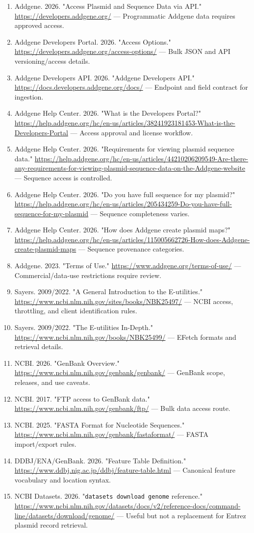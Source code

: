 \documentclass[11pt]{report}
\begin{document}
\begin{enumerate}
\item Addgene. 2026. "Access Plasmid and Sequence Data via API." \url{https://developers.addgene.org/} — Programmatic Addgene data requires approved access.
\item Addgene Developers Portal. 2026. "Access Options." \url{https://developers.addgene.org/access-options/} — Bulk JSON and API versioning/access details.
\item Addgene Developers API. 2026. "Addgene Developers API." \url{https://docs.developers.addgene.org/docs/} — Endpoint and field contract for ingestion.
\item Addgene Help Center. 2026. "What is the Developers Portal?" \url{https://help.addgene.org/hc/en-us/articles/38241923181453-What-is-the-Developers-Portal} — Access approval and license workflow.
\item Addgene Help Center. 2026. "Requirements for viewing plasmid sequence data." \url{https://help.addgene.org/hc/en-us/articles/44210206209549-Are-there-any-requirements-for-viewing-plasmid-sequence-data-on-the-Addgene-website} — Sequence access is controlled.
\item Addgene Help Center. 2026. "Do you have full sequence for my plasmid?" \url{https://help.addgene.org/hc/en-us/articles/205434259-Do-you-have-full-sequence-for-my-plasmid} — Sequence completeness varies.
\item Addgene Help Center. 2026. "How does Addgene create plasmid maps?" \url{https://help.addgene.org/hc/en-us/articles/115005662726-How-does-Addgene-create-plasmid-maps} — Sequence provenance categories.
\item Addgene. 2023. "Terms of Use." \url{https://www.addgene.org/terms-of-use/} — Commercial/data-use restrictions require review.
\item Sayers. 2009/2022. "A General Introduction to the E-utilities." \url{https://www.ncbi.nlm.nih.gov/sites/books/NBK25497/} — NCBI access, throttling, and client identification rules.
\item Sayers. 2009/2022. "The E-utilities In-Depth." \url{https://www.ncbi.nlm.nih.gov/books/NBK25499/} — EFetch formats and retrieval details.
\item NCBI. 2026. "GenBank Overview." \url{https://www.ncbi.nlm.nih.gov/genbank/genbank/} — GenBank scope, releases, and use caveats.
\item NCBI. 2017. "FTP access to GenBank data." \url{https://www.ncbi.nlm.nih.gov/genbank/ftp/} — Bulk data access route.
\item NCBI. 2025. "FASTA Format for Nucleotide Sequences." \url{https://www.ncbi.nlm.nih.gov/genbank/fastaformat/} — FASTA import/export rules.
\item DDBJ/ENA/GenBank. 2026. "Feature Table Definition." \url{https://www.ddbj.nig.ac.jp/ddbj/feature-table.html} — Canonical feature vocabulary and location syntax.
\item NCBI Datasets. 2026. "\texttt{datasets download genome} reference." \url{https://www.ncbi.nlm.nih.gov/datasets/docs/v2/reference-docs/command-line/datasets/download/genome/} — Useful but not a replacement for Entrez plasmid record retrieval.
\end{enumerate}
\end{document}
